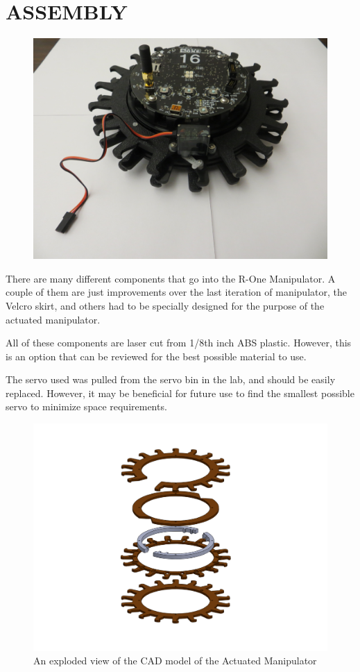 \section{ASSEMBLY}
\label{sec:Assembly}

\begin{figure}[ht]
\begin{center}
\includegraphics[width=.5\linewidth]{./Figs/back_closed}
\end{center}
\caption{}
\label{fig:back closed}
\end{figure}

There are many different components that go into the R-One Manipulator. A couple of them are just improvements over the last iteration of manipulator, the Velcro skirt, and others had to be specially designed for the purpose of the actuated manipulator. 

All of these components are laser cut from 1/8th inch ABS plastic. However, this is an option that can be reviewed for the best possible material to use. 

The servo used was pulled from the servo bin in the lab, and should be easily replaced. However, it may be beneficial for future use to find the smallest possible servo to minimize space requirements. 

\begin{figure}[h]
\begin{center}
\includegraphics[width=.5\linewidth]{./Figs/final_assembly_explodedisometric.pdf}
\end{center}
\caption{An exploded view of the CAD model of the Actuated Manipulator}
\label{fig:explode}
\end{figure}

